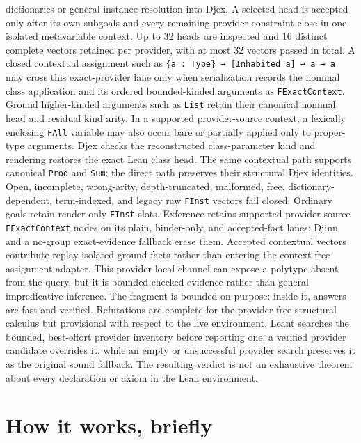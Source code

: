 \documentclass[11pt,oneside]{article}
\newcommand{\code}[1]{\texttt{#1}}
\begin{document}
dictionaries or general instance resolution into Djex. A selected head is
accepted only after its own subgoals and every remaining provider constraint
close in one isolated metavariable context. Up to 32 heads are inspected and
16 distinct complete vectors retained per provider, with at most 32 vectors
passed in total. A closed contextual assignment such as
\code{\{a : Type\} → [Inhabited a] → a → a} may cross this exact-provider lane
only when serialization records the nominal class application and its ordered
bounded-kinded arguments as \code{FExactContext}. Ground higher-kinded
arguments such as \code{List} retain their canonical nominal head and residual
kind arity. In a supported provider-source context, a lexically enclosing
\code{FAll} variable may also occur bare or partially applied only to
proper-type arguments. Djex checks the reconstructed class-parameter kind and
rendering restores the exact Lean class head. The same contextual path
supports canonical \code{Prod} and \code{Sum}; the direct path preserves their
structural Djex identities. Open, incomplete,
wrong-arity, depth-truncated, malformed, free, dictionary-dependent,
term-indexed, and legacy raw \code{FInst} vectors fail closed. Ordinary goals retain render-only
\code{FInst} slots. Exference retains supported provider-source
\code{FExactContext} nodes on its plain, binder-only, and accepted-fact lanes;
Djinn and a no-group exact-evidence fallback erase them. Accepted contextual
vectors contribute replay-isolated ground facts rather than entering the
context-free assignment adapter. This provider-local channel can expose a
polytype absent from the query, but it is bounded checked evidence rather than
general impredicative inference. The fragment is bounded
on purpose: inside it, answers are fast and verified. Refutations are complete
for the provider-free structural calculus but provisional with respect to the
live environment. Leant searches the bounded, best-effort provider inventory
before reporting one: a verified provider candidate overrides it, while an
empty or unsuccessful provider search preserves it as the original sound
fallback. The resulting verdict is not an exhaustive theorem about every
declaration or axiom in the Lean environment.

\section{How it works, briefly}\label{sec:how}
\end{document}

